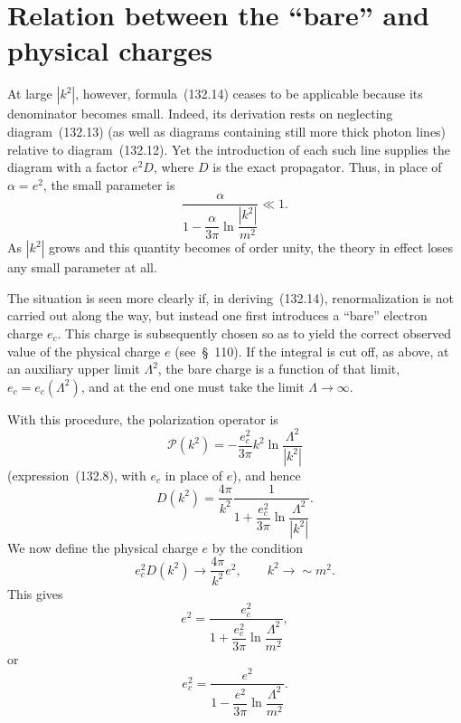 \section{Relation between the ``bare'' and physical charges}

At large $|k^2|$, however, formula~(132.14) ceases to be applicable because its denominator becomes small. Indeed, its derivation rests on neglecting diagram~(132.13) (as well as diagrams containing still more thick photon lines) relative to diagram~(132.12). Yet the introduction of each such line supplies the diagram with a factor $e^2D$, where $D$ is the exact propagator. Thus, in place of $\alpha=e^2$, the small parameter is
\begin{equation}
\frac{\alpha}{1-\dfrac{\alpha}{3\pi}\ln\dfrac{|k^2|}{m^2}}\ll 1.
\tag{133.1}
\end{equation}
As $|k^2|$ grows and this quantity becomes of order unity, the theory in effect loses any small parameter at all.

The situation is seen more clearly if, in deriving~(132.14), renormalization is not carried out along the way, but instead one first introduces a ``bare'' electron charge $e_c$. This charge is subsequently chosen so as to yield the correct observed value of the physical charge $e$ (see~\S~110). If the integral is cut off, as above, at an auxiliary upper limit $\Lambda^2$, the bare charge is a function of that limit, $e_c=e_c(\Lambda^2)$, and at the end one must take the limit $\Lambda\to\infty$.

With this procedure, the polarization operator is
\[
\mathcal P(k^2)=-\frac{e_c^2}{3\pi}k^2\ln\frac{\Lambda^2}{|k^2|}
\]
(expression~(132.8), with $e_c$ in place of $e$), and hence
\begin{equation}
D(k^2)=\frac{4\pi}{k^2}\frac{1}{1+\dfrac{e_c^2}{3\pi}\ln\dfrac{\Lambda^2}{|k^2|}}.
\tag{133.2}
\end{equation}
We now define the physical charge $e$ by the condition
\[
e_c^2D(k^2)\to\frac{4\pi}{k^2}e^2,\qquad k^2\to\sim m^2.
\]
This gives
\begin{equation}
e^2=\frac{e_c^2}{1+\dfrac{e_c^2}{3\pi}\ln\dfrac{\Lambda^2}{m^2}},
\tag{133.3}
\end{equation}
or
\begin{equation}
e_c^2=\frac{e^2}{1-\dfrac{e^2}{3\pi}\ln\dfrac{\Lambda^2}{m^2}}.
\tag{133.4}
\end{equation}


